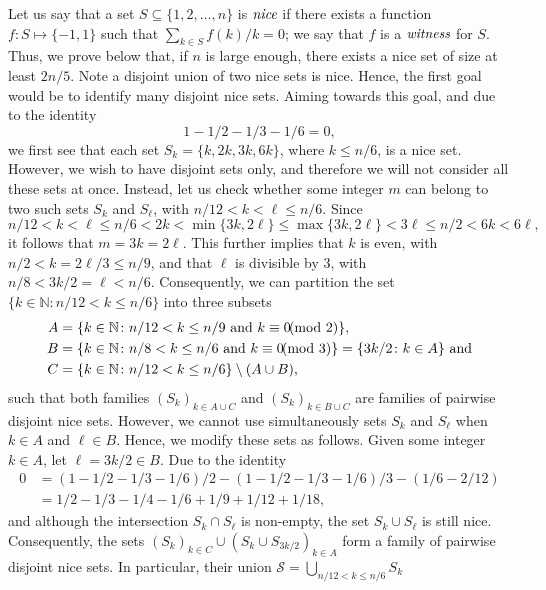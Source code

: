 Let us say that a set $S \subseteq \{1,2,\ldots,n\}$ is $\emph{nice}$ if there exists a function $f : S \mapsto \{-1,1\}$ such that $\sum_{k \in S} f(k) / k = 0$; we say that $f$ is a $\emph{witness}$ for $S$.\nl
Thus, we prove below that, if $n$ is large enough, there exists a nice set of size at least $2n/5$. Note a disjoint union of two nice sets is nice. Hence, the first goal would be to identify many disjoint nice sets.
Aiming towards this goal, and due to the identity
\[1 - 1/2 - 1/3 - 1/6 = 0,\]we first see that each set $S_k = \{k,2k,3k,6k\}$, where $k \leq n/6$, is a nice set. However, we wish to have disjoint sets only, and therefore we will not consider all these sets at once.
\nl
Instead, let us check whether some integer $m$ can belong to two such sets $S_k$ and $S_\ell$, with $n/12 < k < \ell \leq n/6$.
Since\[n/12 < k < \ell \leq n/6 < 2k < \min\{3k,2\ell\} \leq \max\{3k,2\ell\} < 3\ell \leq n/2 < 6 k < 6 \ell,\]it follows that $m = 3 k = 2 \ell$.
\nl
This further implies that $k$ is even, with $n/2 < k = 2 \ell / 3 \leq n/9$, and that $\ell$ is divisible by $3$, with $n/8 < 3 k / 2 = \ell < n/6$.
\nl
Consequently, we can partition the set $\{k \in \mathbb{N} \colon n/12 < k \leq n/6\}$ into three subsets
\begin{align*}
    A & = \{k \in \mathbb{N} \colon n / 12 < k \leq n/9 \text{ and }
    k \equiv 0 \hspace{-2mm}\pmod{2}\} \text{,} \\
    B & = \{k \in \mathbb{N} \colon n / 8 < k \leq n/6 \text{ and }
    k \equiv 0 \hspace{-2mm}\pmod{3}\} =
    \{3 k / 2 \colon k \in A\}  \text{ and} \\
    C & = \{k \in \mathbb{N} \colon n / 12 < k \leq n/6\} \setminus (A \cup B) \text{,}
\end{align*}
such that both families $(S_k)_{k \in A \cup C}$ and $(S_k)_{k \in B \cup C}$ are families of pairwise disjoint nice sets. However, we cannot use simultaneously sets $S_k$ and $S_\ell$ when $k \in A$ and $\ell \in B$.
\nl
Hence, we modify these sets as follows. Given some integer $k \in A$, let $\ell = 3k / 2 \in B$. Due to the identity
\begin{align*}
    0 & = (1-1/2-1/3-1/6)/2 - (1-1/2-1/3-1/6)/3 - (1/6 - 2/12) \\
    & = 1/2 - 1/3 - 1/4 - 1/6 + 1/9 + 1/12 + 1/18,
\end{align*}and although the intersection $S_k \cap S_\ell$ is non-empty, the set $S_k \cup S_\ell$ is still nice. Consequently, the sets $(S_k)_{k \in C} \cup (S_k \cup S_{3k/2})_{k \in A}$ form a family of pairwise disjoint nice sets. In particular, their union $\mathcal{S} = \bigcup_{n/12 < k \leq n/6} S_k$
